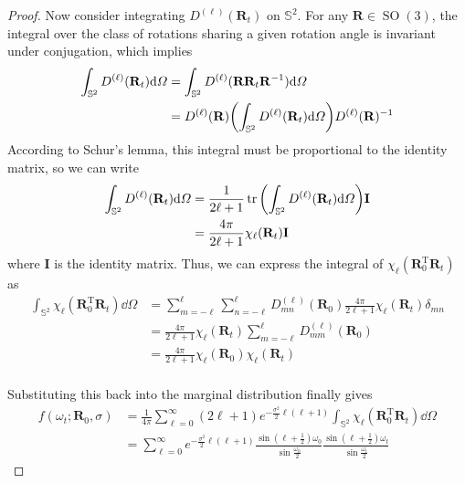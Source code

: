 \documentclass{article}
\theoremstyle{plain}
\theoremstyle{definition}
\theoremstyle{remark}
\DeclareMathOperator{\SO}{SO}
\begin{document}
\begin{proof}
    Now consider integrating $D^{(\ell)}(\mathbf{R}_t)$ on $\mathbb{S}^2$. For any $\mathbf{R} \in \SO(3)$, the integral over the class of rotations sharing a given rotation angle is invariant under conjugation, which implies
    \begin{equation}
        \begin{aligned}
            \int_{\mathbb{S}^2} D^{(\ell)}(\mathbf{R}_t) \dd\varOmega & = \int_{\mathbb{S}^2} D^{(\ell)}(\mathbf{R}\mathbf{R}_t\mathbf{R}^{-1}) \dd\varOmega \\
            & = D^{(\ell)}(\mathbf{R})\qty(\int_{\mathbb{S}^2} D^{(\ell)}(\mathbf{R}_t) \dd\varOmega) D^{(\ell)}(\mathbf{R})^{-1} 
        \end{aligned}
    \end{equation}
    According to Schur's lemma, this integral must be proportional to the identity matrix, so we can write
    \begin{equation}
        \begin{aligned}
            \int_{\mathbb{S}^2} D^{(\ell)}(\mathbf{R}_t) \dd\varOmega & = \frac{1}{2\ell + 1} \tr\qty(\int_{\mathbb{S}^2} D^{(\ell)}(\mathbf{R}_t) \dd\varOmega) \mathbf{I} \\
            & = \frac{4\pi}{2\ell + 1} \chi_\ell(\mathbf{R}_t) \mathbf{I}
    \end{aligned}
    \end{equation}
    where $\mathbf{I}$ is the identity matrix. Thus, we can express the integral of $\chi_\ell(\mathbf{R}_0^\mathrm{T}\mathbf{R}_t)$ as
    \begin{equation}
        \begin{aligned}
            \int_{\mathbb{S}^2} \chi_\ell(\mathbf{R}_0^\mathrm{T}\mathbf{R}_t) \dd\varOmega & = \sum_{m=-\ell}^{\ell} \sum_{n=-\ell}^{\ell} D_{mn}^{(\ell)}(\mathbf{R}_0) \frac{4\pi}{2\ell + 1} \chi_\ell(\mathbf{R}_t) \delta_{mn} \\
            & = \frac{4\pi}{2\ell + 1} \chi_\ell(\mathbf{R}_t) \sum_{m=-\ell}^{\ell} D_{mm}^{(\ell)}(\mathbf{R}_0) \\
            & = \frac{4\pi}{2\ell + 1} \chi_\ell(\mathbf{R}_0) \chi_\ell(\mathbf{R}_t) \\
        \end{aligned}
    \end{equation}

    Substituting this back into the marginal distribution finally gives
    \begin{equation}
        \begin{aligned}
            f(\omega_t; \mathbf{R}_0, \sigma) & = \frac{1}{4\pi} \sum_{\ell=0}^{\infty} (2\ell + 1) e^{-\frac{\sigma^2}{2}\ell(\ell+1)}\int_{\mathbb{S}^2} \chi_\ell(\mathbf{R}_0^\mathrm{T}\mathbf{R}_t) \dd\varOmega \\
            & = \sum_{\ell=0}^{\infty} e^{-\frac{\sigma^2}{2}\ell(\ell+1)}\frac{\sin\left(\ell+\frac{1}{2}\right)\omega_0}{\sin \frac{\omega_0}{2}}\frac{\sin\left(\ell+\frac{1}{2}\right)\omega_t}{\sin \frac{\omega_t}{2}}
        \end{aligned}
    \end{equation}
\end{proof}
\end{document}
